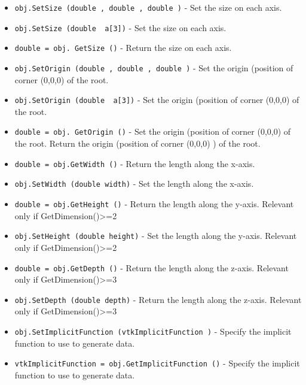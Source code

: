 \begin{itemize}
\item  \verb|obj.SetSize (double , double , double )| -  Set the size on each axis.

\item  \verb|obj.SetSize (double  a[3])| -  Set the size on each axis.

\item  \verb|double = obj. GetSize ()| -  Return the size on each axis.

\item  \verb|obj.SetOrigin (double , double , double )| -  Set the origin (position of corner (0,0,0) of the root.

\item  \verb|obj.SetOrigin (double  a[3])| -  Set the origin (position of corner (0,0,0) of the root.

\item  \verb|double = obj. GetOrigin ()| -  Set the origin (position of corner (0,0,0) of the root.
 Return the origin (position of corner (0,0,0) ) of the root.

\item  \verb|double = obj.GetWidth ()| -  Return the length along the x-axis.
 

\item  \verb|obj.SetWidth (double width)| -  Set the length along the x-axis.
 
 

\item  \verb|double = obj.GetHeight ()| -  Return the length along the y-axis.
 Relevant only if GetDimension()>=2
 

\item  \verb|obj.SetHeight (double height)| -  Set the length along the y-axis.
 Relevant only if GetDimension()>=2
 
 

\item  \verb|double = obj.GetDepth ()| -  Return the length along the z-axis.
 Relevant only if GetDimension()>=3
 

\item  \verb|obj.SetDepth (double depth)| -  Return the length along the z-axis.
 Relevant only if GetDimension()>=3
 
 

\item  \verb|obj.SetImplicitFunction (vtkImplicitFunction )| -  Specify the implicit function to use to generate data.

\item  \verb|vtkImplicitFunction = obj.GetImplicitFunction ()| -  Specify the implicit function to use to generate data.


\end{itemize}
